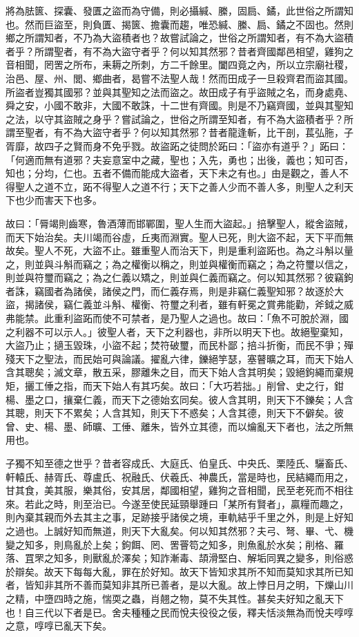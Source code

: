 
\begin{pinyinscope}
將為胠篋、探囊、發匱之盜而為守備，則必攝緘、縢，固扃、鐍，此世俗之所謂知也。然而巨盜至，則負匱、揭篋、擔囊而趨，唯恐緘、縢、扃、鐍之不固也。然則鄉之所謂知者，不乃為大盜積者也？故嘗試論之，世俗之所謂知者，有不為大盜積者乎？所謂聖者，有不為大盜守者乎？何以知其然邪？昔者齊國鄰邑相望，雞狗之音相聞，罔罟之所布，耒耨之所刺，方二千餘里。闔四竟之內，所以立宗廟社稷，治邑、屋、州、閭、鄉曲者，曷嘗不法聖人哉！然而田成子一旦殺齊君而盜其國。所盜者豈獨其國邪？並與其聖知之法而盜之。故田成子有乎盜賊之名，而身處堯、舜之安，小國不敢非，大國不敢誅，十二世有齊國。則是不乃竊齊國，並與其聖知之法，以守其盜賊之身乎？嘗試論之，世俗之所謂至知者，有不為大盜積者乎？所謂至聖者，有不為大盜守者乎？何以知其然邪？昔者龍逢斬，比干剖，萇弘胣，子胥靡，故四子之賢而身不免乎戮。故盜跖之徒問於跖曰：「盜亦有道乎？」跖曰：「何適而無有道邪？夫妄意室中之藏，聖也；入先，勇也；出後，義也；知可否，知也；分均，仁也。五者不備而能成大盜者，天下未之有也。」由是觀之，善人不得聖人之道不立，跖不得聖人之道不行；天下之善人少而不善人多，則聖人之利天下也少而害天下也多。

故曰：「脣竭則齒寒，魯酒薄而邯鄲圍，聖人生而大盜起。」掊擊聖人，縱舍盜賊，而天下始治矣。夫川竭而谷虛，丘夷而淵實。聖人已死，則大盜不起，天下平而無故矣。聖人不死，大盜不止。雖重聖人而治天下，則是重利盜跖也。為之斗斛以量之，則並與斗斛而竊之；為之權衡以稱之，則並與權衡而竊之；為之符璽以信之，則並與符璽而竊之；為之仁義以矯之，則並與仁義而竊之。何以知其然邪？彼竊鉤者誅，竊國者為諸侯，諸侯之門，而仁義存焉，則是非竊仁義聖知邪？故逐於大盜，揭諸侯，竊仁義並斗斛、權衡、符璽之利者，雖有軒冕之賞弗能勸，斧鉞之威弗能禁。此重利盜跖而使不可禁者，是乃聖人之過也。故曰：「魚不可脫於淵，國之利器不可以示人。」彼聖人者，天下之利器也，非所以明天下也。故絕聖棄知，大盜乃止；擿玉毀珠，小盜不起；焚符破璽，而民朴鄙；掊斗折衡，而民不爭；殫殘天下之聖法，而民始可與論議。擢亂六律，鑠絕竽瑟，塞瞽曠之耳，而天下始人含其聰矣；滅文章，散五采，膠離朱之目，而天下始人含其明矣；毀絕鉤繩而棄規矩，攦工倕之指，而天下始人有其巧矣。故曰：「大巧若拙。」削曾、史之行，鉗楊、墨之口，攘棄仁義，而天下之德始玄同矣。彼人含其明，則天下不鑠矣；人含其聰，則天下不累矣；人含其知，則天下不惑矣；人含其德，則天下不僻矣。彼曾、史、楊、墨、師曠、工倕、離朱，皆外立其德，而以爚亂天下者也，法之所無用也。

子獨不知至德之世乎？昔者容成氏、大庭氏、伯皇氏、中央氏、栗陸氏、驪畜氏、軒轅氏、赫胥氏、尊盧氏、祝融氏、伏羲氏、神農氏，當是時也，民結繩而用之，甘其食，美其服，樂其俗，安其居，鄰國相望，雞狗之音相聞，民至老死而不相往來。若此之時，則至治已。今遂至使民延頸舉踵曰「某所有賢者」，贏糧而趣之，則內棄其親而外去其主之事，足跡接乎諸侯之境，車軌結乎千里之外，則是上好知之過也。上誠好知而無道，則天下大亂矣。何以知其然邪？夫弓、弩、畢、弋、機變之知多，則鳥亂於上矣；鉤餌、罔、罟罾笱之知多，則魚亂於水矣；削格、羅落、罝罘之知多，則獸亂於澤矣；知詐漸毒、頡滑堅白、解垢同異之變多，則俗惑於辯矣。故天下每每大亂，罪在於好知。故天下皆知求其所不知而莫知求其所已知者，皆知非其所不善而莫知非其所已善者，是以大亂。故上悖日月之明，下爍山川之精，中墮四時之施，惴耎之蟲，肖翹之物，莫不失其性。甚矣夫好知之亂天下也！自三代以下者是已。舍夫種種之民而悅夫役役之佞，釋夫恬淡無為而悅夫啍啍之意，啍啍已亂天下矣。


\end{pinyinscope}